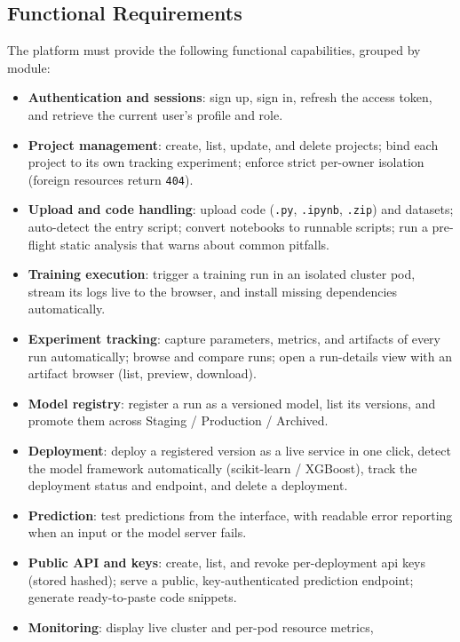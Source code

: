 \subsection{Functional Requirements}
The platform must provide the following functional capabilities, grouped by
module:
\begin{itemize}[leftmargin=1.4em]
  \item \textbf{Authentication and sessions}: sign up, sign in, refresh the
        access token, and retrieve the current user's profile and role.
  \item \textbf{Project management}: create, list, update, and delete projects;
        bind each project to its own tracking experiment; enforce strict
        per-owner isolation (foreign resources return \texttt{404}).
  \item \textbf{Upload and code handling}: upload code
        (\texttt{.py}, \texttt{.ipynb}, \texttt{.zip}) and datasets;
        auto-detect the entry script; convert notebooks to runnable scripts;
        run a pre-flight static analysis that warns about common pitfalls.
  \item \textbf{Training execution}: trigger a training run in an isolated
        cluster pod, stream its logs live to the browser, and install missing
        dependencies automatically.
  \item \textbf{Experiment tracking}: capture parameters, metrics, and
        artifacts of every run automatically; browse and compare runs; open a
        run-details view with an artifact browser (list, preview, download).
  \item \textbf{Model registry}: register a run as a versioned model, list its
        versions, and promote them across Staging / Production / Archived.
  \item \textbf{Deployment}: deploy a registered version as a live service in
        one click, detect the model framework automatically
        (scikit-learn / XGBoost), track the deployment status and endpoint, and
        delete a deployment.
  \item \textbf{Prediction}: test predictions from the interface, with readable
        error reporting when an input or the model server fails.
  \item \textbf{Public API and keys}: create, list, and revoke per-deployment
        \gls{api} keys (stored hashed); serve a public, key-authenticated
        prediction endpoint; generate ready-to-paste code snippets.
  \item \textbf{Monitoring}: display live cluster and per-pod resource metrics,

\end{itemize}
